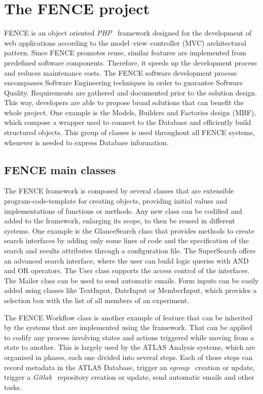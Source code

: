 \section{The FENCE project}
\label{sec:The_FENCE_project}
FENCE is an object oriented \textit{PHP}~\cite{php} framework designed for the development of web applications according to the model–view–controller (MVC) architectural pattern. Since FENCE promotes reuse, similar features are implemented from predefined software components. Therefore, it speeds up the development process and reduces maintenance costs. The FENCE software development process encompasses Software Engineering techniques in order to guarantee Software Quality. Requirements are gathered and documented prior to the solution design. This way, developers are able to propose broad solutions that can benefit the whole project. One example is the Models, Builders and Factories design (MBF), which compose a wrapper used to connect to the Database and efficiently build structured objects. This group of classes is used throughout all FENCE systems, whenever is needed to express Database information.

\subsection{FENCE main classes}
\label{sec:FENCE_main_classes}
The FENCE framework is composed by several classes that are extensible program-code-template for creating objects, providing initial values and implementations of functions or methods. Any new class can be codified and added to the framework, enlarging its scope, to then be reused in different systems. One example is the GlanceSearch class that provides methods to create search interfaces by adding only some lines of code and the specification of the search and results attributes through a configuration file. The SuperSearch offers an advanced search interface, where the user can build logic queries with AND and OR operators. The User class supports the access control of the interfaces. The Mailer class can be used to send automatic emails. Form inputs can be easily added using classes like TextInput, DateInput or MemberInput, which provides a selection box with the list of all members of an experiment.
                    
The FENCE Workflow class is another example of feature that can be inherited by the systems that are implemented using the framework. That can be applied to codify any process involving states and actions triggered while moving from a state to another. This is largely used by the ATLAS Analysis systems, which are organised in phases, each one divided into several steps. Each of those steps can record metadata in the ATLAS Database, trigger an \textit{egroup}~\cite{egroups} creation or update, trigger a \textit{Gitlab}~\cite{gitlab} repository creation or update, send automatic emails and other tasks. 


